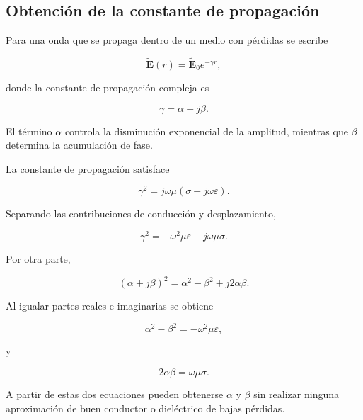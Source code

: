 \subsection{Obtención de la constante de propagación}

Para una onda que se propaga dentro de un medio con pérdidas se escribe

\begin{equation}
\widetilde{\mathbf{E}}(r)
=
\widetilde{\mathbf{E}}_0 e^{-\gamma r},
\end{equation}

donde la constante de propagación compleja es

\begin{equation}
\gamma=\alpha+j\beta.
\end{equation}

El término $\alpha$ controla la disminución exponencial de la amplitud, mientras que $\beta$ determina la acumulación de fase.

La constante de propagación satisface

\begin{equation}
\gamma^2
=
j\omega\mu
\left(
\sigma+j\omega\varepsilon
\right).
\end{equation}

Separando las contribuciones de conducción y desplazamiento,

\begin{equation}
\gamma^2
=
-\omega^2\mu\varepsilon
+
j\omega\mu\sigma.
\end{equation}

Por otra parte,

\begin{equation}
(\alpha+j\beta)^2
=
\alpha^2-\beta^2
+
j2\alpha\beta.
\end{equation}

Al igualar partes reales e imaginarias se obtiene

\begin{equation}
\alpha^2-\beta^2
=
-\omega^2\mu\varepsilon,
\label{eq:real_gamma}
\end{equation}

y

\begin{equation}
2\alpha\beta
=
\omega\mu\sigma.
\label{eq:imag_gamma}
\end{equation}

A partir de estas dos ecuaciones pueden obtenerse $\alpha$ y $\beta$ sin realizar ninguna aproximación de buen conductor o dieléctrico de bajas pérdidas.

